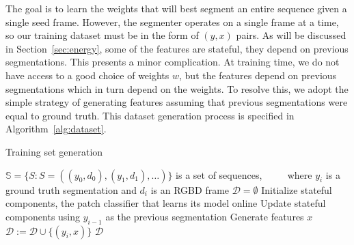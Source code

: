 \documentclass[graybox]{svmult}
\begin{document}
The goal is to learn the weights that will best segment an entire sequence given a single seed frame.  However, the segmenter operates on a single frame at a time, so our training dataset must be in the form of $(y, x)$ pairs. As will be discussed in Section~\ref{sec:energy}, some of the features are stateful, \ie they depend on previous segmentations.  This presents a minor complication.  At training time, we do not have access to a good choice of weights $w$, but the features depend on previous segmentations which in turn depend on the weights.  To resolve this, we adopt the simple strategy of generating features assuming that previous segmentations were equal to ground truth.  This dataset generation process is specified in Algorithm~\ref{alg:dataset}.

\begin{algorithm}
  \caption{Training set generation}
  \label{alg:dataset}
  \begin{algorithmic}
    \STATE $\mathbb{S} = \{S : S = ((y_0, d_0), (y_1, d_1),                       \dots)\}$ is a set of sequences,
\STATE $\qquad$ where $y_i$ is a ground truth segmentation and $d_i$ is an RGBD frame
\STATE $\mathcal{D} = \emptyset$
\STATE Initialize stateful components, \eg the patch classifier that learns its model online
\STATE Update stateful components using $y_{i-1}$ as the previous segmentation
\STATE Generate features $x$
\STATE $\mathcal{D} := \mathcal{D} \cup \{(y_i, x)\}$
\ENDFOR
\ENDFOR
\RETURN $\mathcal{D}$
  \end{algorithmic}
\end{algorithm}
\end{document}
